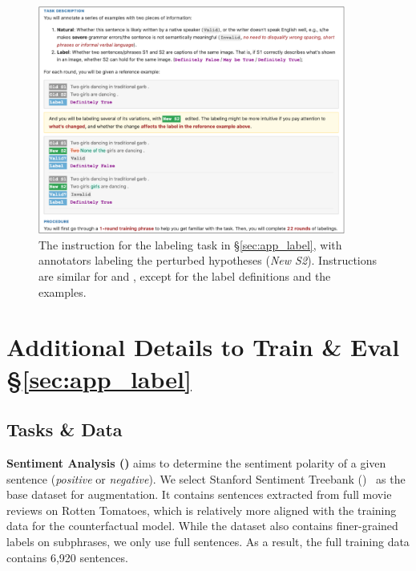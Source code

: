 \begin{figure}
\centering
\includegraphics[width=0.9\textwidth]{figures/mturk_instruction.pdf}
\vspace{-1pt}
\caption{
The instruction for the \nli labeling task in \S\ref{sec:app_label}, with annotators labeling the perturbed hypotheses (\emph{New S2}). 
Instructions are similar for \qqp and \sst, except for the label definitions and the examples.
}
\vspace{-10pt}
\label{fig:mturk_instruction}

\end{figure}




\section{Additional Details to Train \& Eval \S\ref{sec:app_label}}
\label{appendix:app_label}

\subsection{Tasks \& Data}
\label{appendix:app_label_data}

\textbf{Sentiment Analysis (\sst)} aims to determine the sentiment polarity of a given sentence (\emph{positive} or \emph{negative}). 
We select Stanford Sentiment Treebank (\dsst)~\cite{socher2013recursive} as the base dataset for augmentation.
It contains sentences extracted from full movie reviews on Rotten Tomatoes, which is relatively more aligned with the training data for the counterfactual model. 
While the dataset also contains finer-grained labels on subphrases, we only use full sentences.
As a result, the full training data contains 6,920 sentences.

